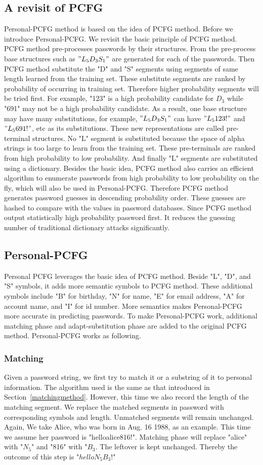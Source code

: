 \documentclass{sig-alternate}
\begin{document}
\subsection{A revisit of PCFG}
Personal-PCFG method is based on the idea of PCFG method. Before we introduce Personal-PCFG. We revisit the basic principle of PCFG method. PCFG method pre-processes passwords by their structures. From the pre-process base structures such as $"L_5D_3S_1"$ are generated for each of the passwords. Then PCFG method substitute the "D" and "S" segments using segments of same length learned from the training set. These substitute segments are ranked by probability of occurring in training set. Therefore higher probability segments will be tried first. For example, "123" is a high probability candidate for $D_3$ while "691" may not be a high probability candidate. As a result, one base structure may have many substitutions, for example, $"L_5D_3S_1"$ can have $"L_5123!"$ and $"L_5691!"$, etc as its substitutions. These new representations are called pre-terminal structures. No "L" segment is substituted because the space of alpha strings is too large to learn from the training set. These pre-terminals are ranked from high probability to low probability. And finally "L" segments are substituted using a dictionary. Besides the basic idea, PCFG method also carries an efficient algorithm to enumerate passwords from high probability to low probability on the fly, which will also be used in Personal-PCFG. Therefore PCFG method generates password guesses in descending probability order. These guesses are hashed to compare with the values in password databases. Since PCFG method output statistically high probability password first. It reduces the guessing number of traditional dictionary attacks significantly. 

\subsection{Personal-PCFG}
Personal PCFG leverages the basic idea of PCFG method. Beside "L", "D", and "S" symbols, it adds more semantic symbols to PCFG method. These additional symbols include "B" for birthday, "N" for name, "E" for email address, "A" for account name, and "I" for id number. More semantics makes Personal-PCFG more accurate in predicting passwords. To make Personal-PCFG work, additional matching phase and adapt-substitution phase are added to the original PCFG method. Personal-PCFG works as following.
\subsubsection{Matching}
Given a password string, we first try to match it or a substring of it to personal information. The algorithm used is the same as that introduced in Section~\ref{matchingmethod}. However, this time we also record the length of the matching segment. We replace the matched segments in password with corresponding symbols and length. Unmatched segments will remain unchanged. Again, We take Alice, who was born in Aug. 16 1988, as an example. This time we assume her password is "helloalice816!". Matching phase will replace "alice" with "$N_5$" and "816" with "$B_3$. The leftover is kept unchanged. Thereby the outcome of this step is "$helloN_5B_3!$" 
\end{document}
